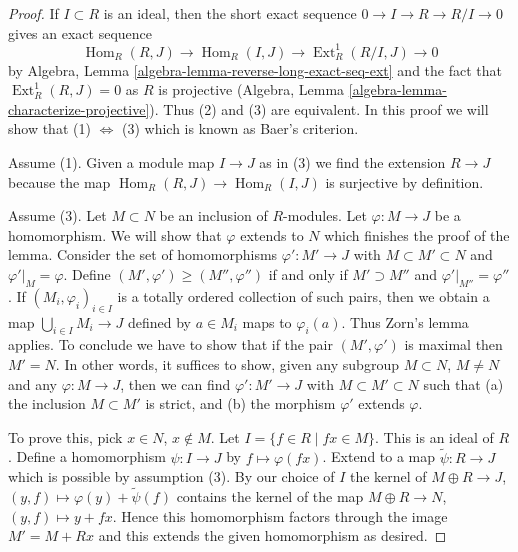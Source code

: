 \documentclass[10pt,a4paper]{amsart}
\theoremstyle{plain}
\theoremstyle{definition}
\theoremstyle{remark}
\numberwithin{equation}{subsection}
\def\Hom{\mathop{\mathrm{Hom}}\nolimits}
\def\Ext{\mathop{\mathrm{Ext}}\nolimits}
\begin{document}
\begin{proof}
If $I \subset R$ is an ideal, then the short exact sequence
$0 \to I \to R \to R/I \to 0$ gives an exact sequence
$$
\Hom_R(R, J) \to
\Hom_R(I, J) \to
\Ext^1_R(R/I, J) \to 0
$$
by Algebra, Lemma \ref{algebra-lemma-reverse-long-exact-seq-ext}
and the fact that $\Ext^1_R(R, J) = 0$ as $R$ is projective
(Algebra, Lemma \ref{algebra-lemma-characterize-projective}).
Thus (2) and (3) are equivalent. In this proof
we will show that (1) $\Leftrightarrow$ (3) which is known
as Baer's criterion.

\medskip\noindent
Assume (1). Given a module map $I \to J$ as in (3) we find
the extension $R \to J$ because the map
$\Hom_R(R, J) \to \Hom_R(I, J)$ is surjective
by definition.

\medskip\noindent
Assume (3). Let $M \subset N$ be an inclusion of $R$-modules.
Let $\varphi : M \to J$ be a homomorphism. We will show that $\varphi$
extends to $N$ which finishes the proof of the lemma.
Consider the set of homomorphisms $\varphi' : M' \to J$
with $M \subset M' \subset N$ and $\varphi'|_M = \varphi$.
Define $(M', \varphi') \geq (M'', \varphi'')$ if
and only if $M' \supset M''$ and $\varphi'|_{M''} = \varphi''$.
If $(M_i, \varphi_i)_{i \in I}$ is a totally
ordered collection of such pairs, then we obtain a map
$\bigcup_{i \in I} M_i \to J$ defined by $a \in M_i$
maps to $\varphi_i(a)$. Thus Zorn's lemma applies.
To conclude we have to show that if the pair
$(M', \varphi')$ is maximal then $M' = N$.
In other words, it suffices to show, given
any subgroup $M \subset N$, $M \not = N$ and
any $\varphi : M \to J$, then we can find
$\varphi' : M' \to J$ with $M \subset M' \subset N$
such that (a) the inclusion $M \subset M'$ is strict, and
(b) the morphism $\varphi'$ extends $\varphi$.

\medskip\noindent
To prove this, pick $x \in N$, $x \not \in M$.
Let $I = \{f \in R \mid fx \in M\}$. This is an ideal of $R$.
Define a homomorphism $\psi : I \to J$ by $f \mapsto \varphi(fx)$.
Extend to a map $\tilde\psi : R \to J$ which is possible by assumption (3).
By our choice of $I$ the kernel of
$M \oplus R \to J$, $(y, f) \mapsto \varphi(y) + \tilde\psi(f)$
contains the kernel of the map $M \oplus R \to N$,
$(y, f) \mapsto y + fx$. Hence this homomorphism factors
through the image $M' = M + Rx$ and this extends the given homomorphism
as desired.
\end{proof}
\end{document}
